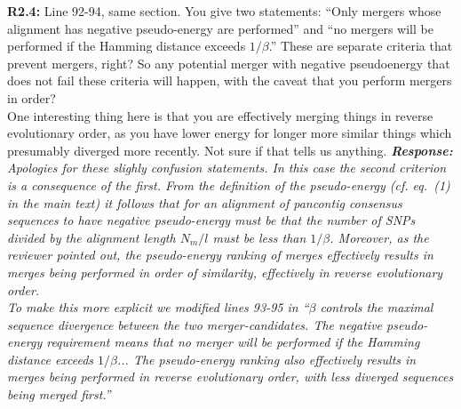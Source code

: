 \documentclass[aps,rmp,onecolumn]{revtex4-1}
\newcommand{\Marco}[1]{{\color{gray}Marco: #1}}
\newcommand{\Liam}[1]{{\color{teal}Liam: #1}}
\newcommand{\reviewer}[2]{\textbf{#1:} #2\vskip 5mm}
\newcommand{\response}[1]{{\it {\color{response}\textbf{Response:} #1}}\vskip 5mm}
\begin{document}
\reviewer{R2.4}{Line 92-94, same section. You give two statements:
      ``Only mergers whose alignment has negative pseudo-energy are performed''
      and
      ``no mergers will be performed if the Hamming distance exceeds $1/\beta$.''
      These are separate criteria that prevent mergers, right? So any potential merger with negative pseudoenergy that does not fail these criteria will happen, with the caveat that you perform mergers in order?\\
      One interesting thing here is that you are effectively merging things in reverse evolutionary order, as you have lower energy for longer more similar things which presumably diverged more recently. Not sure if that tells us anything.}
\response{
      Apologies for these slighly confusion statements.
      In this case the second criterion is a consequence of the first. From the definition of the pseudo-energy (cf. eq.~(1) in the main text) it follows that for an alignment of pancontig consensus sequences to have negative pseudo-energy must be that the number of SNPs divided by the alignment length $N_m/l$ must be less than $1/\beta$. Moreover, as the reviewer pointed out, the pseudo-energy ranking of merges effectively results in merges being performed in order of similarity, effectively in reverse evolutionary order. \\

      To make this more explicit we modified lines 93-95 in ``$\beta$ controls the maximal sequence divergence between the two merger-candidates. The negative pseudo-energy requirement means that no merger will be performed if the Hamming distance exceeds $1/\beta$... The pseudo-energy ranking also effectively results in merges being performed in reverse evolutionary order, with less diverged sequences being merged first.''
}
\end{document}
